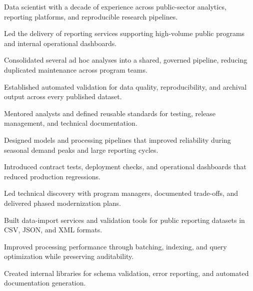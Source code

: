 \documentclass[fontsize=11pt, margin=narrow, medium=print]{careerdossier-resume}
\begin{document}
\MakeCDossierHeader

Data scientist with a decade of experience across public-sector analytics,
reporting platforms, and reproducible research pipelines.

\begin{CDossierEntry}[title = {Principal Data Scientist}, organization = {Digital Services Laboratory}, location = {Ottawa, ON}, dates = {2024--Present}]
  \begin{CDossierItemize}
    \item Led the delivery of reporting services supporting high-volume public programs and internal operational dashboards.
    \item Consolidated several ad hoc analyses into a shared, governed pipeline, reducing duplicated maintenance across program teams.
    \item Established automated validation for data quality, reproducibility, and archival output across every published dataset.
    \item Mentored analysts and defined reusable standards for testing, release management, and technical documentation.
  \end{CDossierItemize}
\end{CDossierEntry}
\begin{CDossierEntry}[title = {Senior Data Scientist}, organization = {Civic Technology Research Group}, location = {Toronto, ON}, dates = {2021--2024}]
  \begin{CDossierItemize}
    \item Designed models and processing pipelines that improved reliability during seasonal demand peaks and large reporting cycles.
    \item Introduced contract tests, deployment checks, and operational dashboards that reduced production regressions.
    \item Led technical discovery with program managers, documented trade-offs, and delivered phased modernization plans.
  \end{CDossierItemize}
\end{CDossierEntry}
\begin{CDossierEntry}[title = {Data Scientist}, organization = {Public Data Analytics Incorporated}, location = {Waterloo, ON}, dates = {2018--2021}]
  \begin{CDossierItemize}
    \item Built data-import services and validation tools for public reporting datasets in CSV, JSON, and XML formats.
    \item Improved processing performance through batching, indexing, and query optimization while preserving auditability.
    \item Created internal libraries for schema validation, error reporting, and automated documentation generation.
  \end{CDossierItemize}
\end{CDossierEntry}
\end{document}
